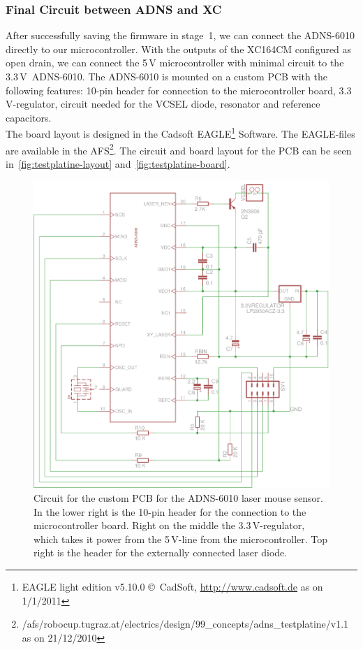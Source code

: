 \documentclass[12pt,a4paper]{article}
\begin{document}

\subsubsection{Final Circuit between ADNS and XC}
\label{adns-pcb}

After successfully saving the firmware in stage~1, we can connect the ADNS-6010 directly to our microcontroller.
With the outputs of the XC164CM configured as open drain, we can connect the 5\,V microcontroller with minimal circuit to the 3.3\,V~ADNS-6010.
The ADNS-6010 is mounted on a custom PCB with the following features: 
10-pin header for connection to the microcontroller board,
\hbox{3.3\,V-regulator},
circuit needed for the VCSEL diode,
resonator and reference capacitors.\\
The board layout is designed in the Cadsoft EAGLE\footnote{EAGLE light edition v5.10.0 \copyright~CadSoft, \url{http://www.cadsoft.de} as on 1/1/2011} Software.
The EAGLE-files are available in the AFS\footnote{/afs/robocup.tugraz.at/electrics/design/99\_concepts/adns\_testplatine/v1.1 as on 21/12/2010}.
The circuit and board layout for the PCB can be seen in~\autoref{fig:testplatine-layout} and~\autoref{fig:testplatine-board}.

\begin{figure}[htbp]
\begin{center}
\includegraphics[width=1\columnwidth]{figures/schaltplan.png}
\caption{\label{fig:testplatine-layout}
Circuit for the custom PCB for the ADNS-6010 laser mouse sensor.
In the lower right is the 10-pin header for the connection to the microcontroller board.
Right on the middle the 3.3\,V-regulator, which takes it power from the 5\,V-line from the microcontroller.
Top right is the header for the externally connected laser diode.
}
\end{center}
\end{figure}
\end{document}
